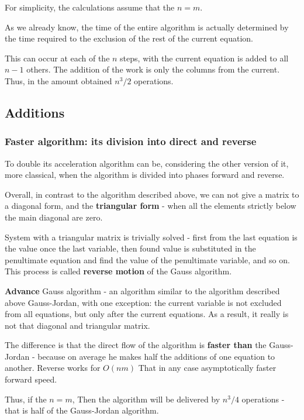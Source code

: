 For simplicity, the calculations assume that the $n = m$.

As we already know, the time of the entire algorithm is actually determined by the time required to the exclusion of the rest of the current equation.

This can occur at each of the $n$ steps, with the current equation is added to all $n-1$ others. The addition of the work is only the columns from the current. Thus, in the amount obtained $n ^ 3/2$ operations.

\subsection{ Additions }

\subsubsection{ Faster algorithm: its division into direct and reverse }

To double its acceleration algorithm can be, considering the other version of it, more classical, when the algorithm is divided into phases forward and reverse.

Overall, in contrast to the algorithm described above, we can not give a matrix to a diagonal form, and the \textbf{triangular form} - when all the elements strictly below the main diagonal are zero.

System with a triangular matrix is ​​trivially solved - first from the last equation is the value once the last variable, then found value is substituted in the penultimate equation and find the value of the penultimate variable, and so on. This process is called \textbf{reverse motion} of the Gauss algorithm.

\textbf{Advance} Gauss algorithm - an algorithm similar to the algorithm described above Gauss-Jordan, with one exception: the current variable is not excluded from all equations, but only after the current equations. As a result, it really is not that diagonal and triangular matrix.

The difference is that the direct flow of the algorithm is \textbf{faster than} the Gauss-Jordan - because on average he makes half the additions of one equation to another. Reverse works for $O (nm)$ That in any case asymptotically faster forward speed.

Thus, if the $n = m$, Then the algorithm will be delivered by $n ^ 3/4$ operations - that is half of the Gauss-Jordan algorithm.

